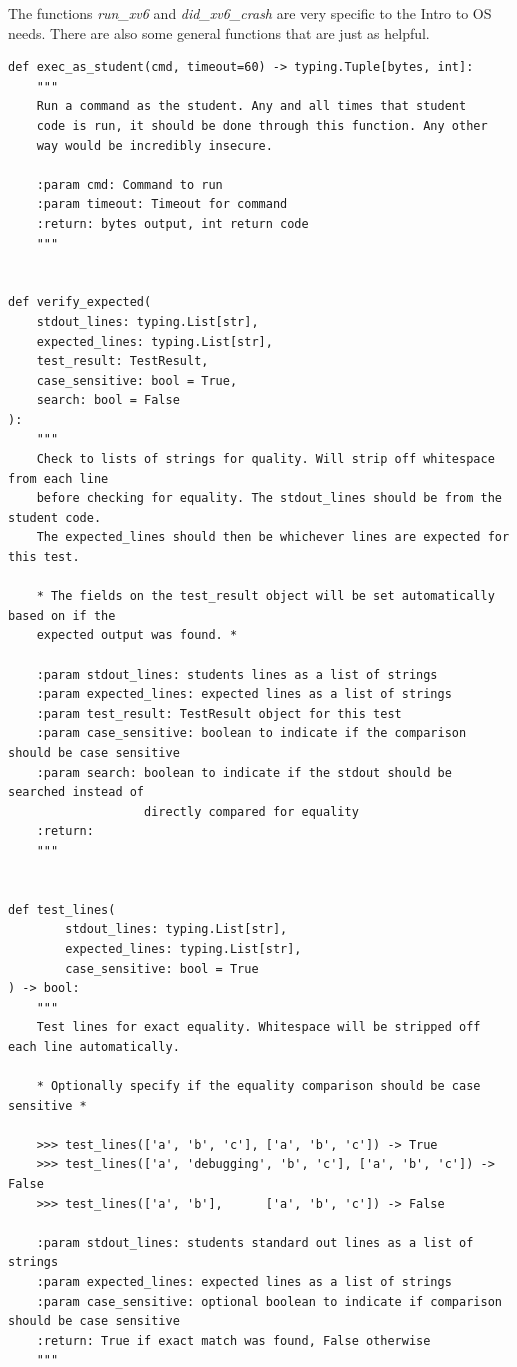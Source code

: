 The functions \textit{run\_xv6} and \textit{did\_xv6\_crash} are very specific to the Intro to OS needs.
There are also some general functions that are just as helpful.

\begin{verbatim}
def exec_as_student(cmd, timeout=60) -> typing.Tuple[bytes, int]:
    """
    Run a command as the student. Any and all times that student
    code is run, it should be done through this function. Any other
    way would be incredibly insecure.

    :param cmd: Command to run
    :param timeout: Timeout for command
    :return: bytes output, int return code
    """


def verify_expected(
    stdout_lines: typing.List[str],
    expected_lines: typing.List[str],
    test_result: TestResult,
    case_sensitive: bool = True,
    search: bool = False
):
    """
    Check to lists of strings for quality. Will strip off whitespace from each line
    before checking for equality. The stdout_lines should be from the student code.
    The expected_lines should then be whichever lines are expected for this test.

    * The fields on the test_result object will be set automatically based on if the
    expected output was found. *

    :param stdout_lines: students lines as a list of strings
    :param expected_lines: expected lines as a list of strings
    :param test_result: TestResult object for this test
    :param case_sensitive: boolean to indicate if the comparison should be case sensitive
    :param search: boolean to indicate if the stdout should be searched instead of
                   directly compared for equality
    :return:
    """


def test_lines(
        stdout_lines: typing.List[str],
        expected_lines: typing.List[str],
        case_sensitive: bool = True
) -> bool:
    """
    Test lines for exact equality. Whitespace will be stripped off each line automatically.

    * Optionally specify if the equality comparison should be case sensitive *

    >>> test_lines(['a', 'b', 'c'], ['a', 'b', 'c']) -> True
    >>> test_lines(['a', 'debugging', 'b', 'c'], ['a', 'b', 'c']) -> False
    >>> test_lines(['a', 'b'],      ['a', 'b', 'c']) -> False

    :param stdout_lines: students standard out lines as a list of strings
    :param expected_lines: expected lines as a list of strings
    :param case_sensitive: optional boolean to indicate if comparison should be case sensitive
    :return: True if exact match was found, False otherwise
    """



\end{verbatim}
